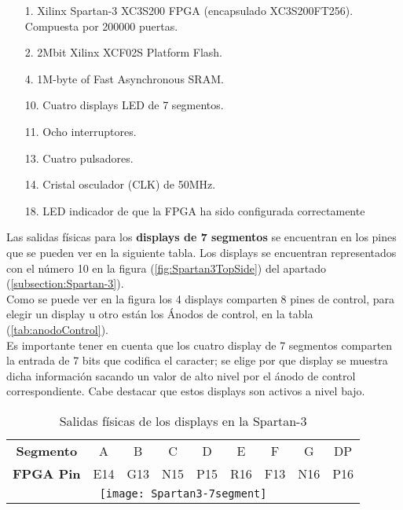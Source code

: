     \begin{itemize}
        \item [1.] Xilinx Spartan-3 XC3S200 FPGA  (encapsulado XC3S200FT256). Compuesta por 200000 puertas.
        \item [2.] 2Mbit Xilinx XCF02S Platform Flash.
        \item [4.] 1M-byte of Fast Asynchronous SRAM.
        \item [10.] Cuatro displays LED de 7 segmentos.
        \item [11.] Ocho interruptores.
        \item [13.] Cuatro pulsadores.
        \item [14.] Cristal osculador (CLK) de 50MHz.
        \item [18.] LED indicador de que la FPGA ha sido configurada correctamente

    \end{itemize}

    Las salidas físicas para los \textbf{displays de 7 segmentos} se encuentran en los pines que se pueden ver en la siguiente tabla. Los displays se encuentran representados con el número 10 en la figura (\ref{fig:Spartan3TopSide}) del apartado (\ref{subsection:Spartan-3}). \\ 

    Como se puede ver en la figura los 4 displays comparten 8 pines de control, para elegir un display u otro están los Ánodos de control, en la tabla (\ref{tab:anodoControl}). \\ 

    Es importante tener en cuenta que los cuatro display de 7 segmentos comparten la entrada de 7 bits que codifica el caracter; se elige por que display se muestra dicha información sacando un valor de alto nivel por el ánodo de control correspondiente. Cabe destacar que estos displays son activos a nivel bajo. \\ 

    \begin{table}[H]
            \centering
            \begin{tabular}{|c|c|c|c|c|c|c|c|c|}
                \hline
                \rowcolor[rgb]{0.21,0.69,0.87}\multicolumn{9}{|c|}{  \textbf{ {Salidas físicas Display 7 segmentos}}} \\
                \hline \hline
                \textbf{  Segmento  } & A & B & C & D & E & F & G & DP \\ 
                \hline
                \textbf{  FPGA Pin  }  & E14 & G13 & N15 & P15 & R16 & F13 & N16 & P16 \\ 
                \hline
                \multicolumn{9}{|c|}{\texttt{[image: Spartan3-7segment]}}\\
                \hline
                 
            \end{tabular}
        \caption{ Salidas físicas de los displays en la Spartan-3 }
        \label{tab:tablaSalidas7Segmentos}
    \end{table}

